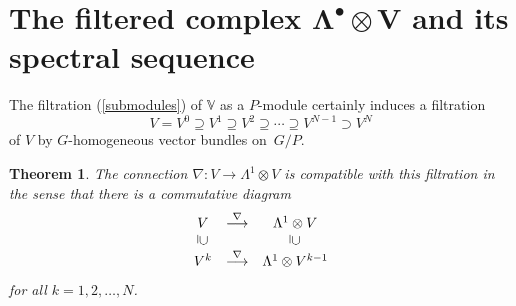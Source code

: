 \documentclass[11pt]{article}
\newtheorem{theorem}{Theorem}
\begin{document}
\section[The filtered complex $\Lambda^\bullet\otimes V$ and its spectral sequence]{The f\/iltered complex $\boldsymbol{\Lambda^\bullet\otimes V}$ and its spectral sequence}

The f\/iltration (\ref{submodules}) of ${\mathbb{V}}$ as a $P$-module certainly
induces a f\/iltration
\[
V=V^0\supseteq V^1\supseteq V^2\supseteq\cdots\supseteq V^{N-1}\supset V^N
\]
of $V$ by $G$-homogeneous vector bundles on~$G/P$.
\begin{theorem}\label{compatible} The connection
$\nabla:V\to\Lambda^1\otimes V$ is compatible with this filtration in the
sense that there is a commutative diagram
\[\begin{array}{ccc}V&\stackrel{\nabla}{\longrightarrow}&\Lambda^1\otimes V\\
\rule[.7pt]{.4pt}{6pt}\hspace*{.7pt}\cup
&&\rule[.7pt]{.4pt}{6pt}\hspace*{.7pt}\cup\\
V^k&\stackrel{\nabla}{\longrightarrow}&\Lambda^1\otimes V^{k-1}
\end{array}\]
for all $k=1,2,\ldots,N$.
\end{theorem}
\end{document}
